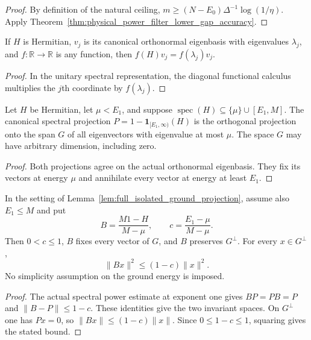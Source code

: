 \begin{proof}
    \leanok
    By definition of the natural ceiling,
    $m\ge (N-E_0)\Delta^{-1}\log(1/\eta)$.
    Apply Theorem~\ref{thm:physical_power_filter_lower_gap_accuracy}.
\end{proof}


\begin{lemma}
    \label{lem:hermitian_cfc_eigenbasis_action}
    \leanok
    If $H$ is Hermitian, $v_j$ is its canonical orthonormal eigenbasis
    with eigenvalues $\lambda_j$, and $f:\mathbb R\to\mathbb R$ is any
    function, then $f(H)v_j=f(\lambda_j)v_j$.
\end{lemma}
\begin{proof}\leanok
    In the unitary spectral representation, the diagonal functional
    calculus multiplies the $j$th coordinate by $f(\lambda_j)$.
\end{proof}

\begin{lemma}
    \label{lem:full_isolated_ground_projection}
    \leanok
    Let $H$ be Hermitian, let $\mu<E_1$, and suppose
    $\operatorname{spec}(H)\subseteq\{\mu\}\cup[E_1,M]$.
    The canonical spectral projection
    $P=1-\boldsymbol1_{[E_1,\infty)}(H)$ is the orthogonal projection
    onto the span $G$ of all eigenvectors with eigenvalue at most $\mu$.
    The space $G$ may have arbitrary dimension, including zero.
\end{lemma}
\begin{proof}\leanok
    Both projections agree on the actual orthonormal eigenbasis.
    They fix its vectors at energy $\mu$ and annihilate every vector
    at energy at least $E_1$.
\end{proof}

\begin{lemma}
    \label{lem:full_ground_normalized_affine_filter}
    \leanok
    In the setting of Lemma~\ref{lem:full_isolated_ground_projection},
    assume also $E_1\le M$ and put
    \[
        B=\frac{M1-H}{M-\mu},\qquad c=\frac{E_1-\mu}{M-\mu}.
    \]
    Then $0<c\le1$, $B$ fixes every vector of $G$, and $B$ preserves
    $G^\perp$. For every $x\in G^\perp$,
    \[
        \|Bx\|^2\le(1-c)\|x\|^2.
    \]
    No simplicity assumption on the ground energy is imposed.
\end{lemma}
\begin{proof}\leanok
    The actual spectral power estimate at exponent one gives
    $BP=PB=P$ and $\|B-P\|\le1-c$. These identities give the two
    invariant spaces. On $G^\perp$ one has $Px=0$, so
    $\|Bx\|\le(1-c)\|x\|$. Since $0\le1-c\le1$, squaring gives
    the stated bound.
\end{proof}


